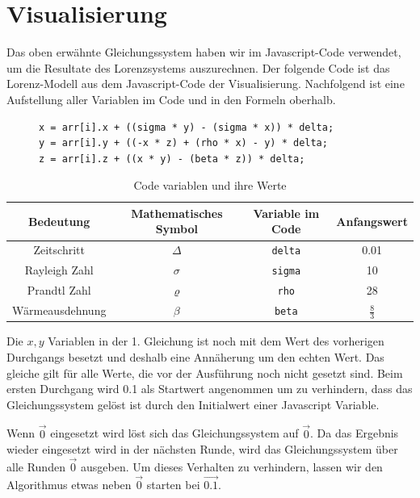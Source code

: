 
\section{Visualisierung}
Das oben erwähnte Gleichungssystem haben wir im Javascript-Code verwendet, um die Resultate des Lorenzsystems auszurechnen. Der folgende Code ist das Lorenz-Modell aus dem Javascript-Code der Visualisierung. Nachfolgend ist eine Aufstellung aller Variablen im Code und in den Formeln oberhalb.

\begin{figure}
	\begin{lstlisting}[style=C]
x = arr[i].x + ((sigma * y) - (sigma * x)) * delta;
y = arr[i].y + ((-x * z) + (rho * x) - y) * delta;
z = arr[i].z + ((x * y) - (beta * z)) * delta;
		\end{lstlisting}
\end{figure}

\begin{table}[]
	\begin{tabular}{| c | c | c | c |}
		\hline
		\textbf{Bedeutung} & \textbf{Mathematisches Symbol} & \textbf{Variable im Code} & \textbf{Anfangswert}\\\hline
		Zeitschritt & $ \Delta $ & \texttt{delta} & 0.01 \\\hline
		Rayleigh Zahl & $ \sigma $ & \texttt{sigma} & 10 \\\hline
		Prandtl Zahl & $\varrho $ & \texttt{rho} & 28 \\\hline
		Wärmeausdehnung & $\beta $ & \texttt{beta}  & $ \frac{8}{3} $ \\\hline
	\end{tabular}
	\caption{Code variablen und ihre Werte\label{CodeVariablen}}
\end{table}

Die $ x, y $ Variablen in der 1. Gleichung ist noch mit dem Wert des vorherigen Durchgangs besetzt und deshalb eine Annäherung um den echten Wert. Das gleiche gilt für alle Werte, die vor der Ausführung noch nicht gesetzt sind. 
Beim ersten Durchgang wird 0.1 als Startwert angenommen um zu verhindern, dass das Gleichungssystem gelöst ist durch den Initialwert einer Javascript Variable. 

Wenn $ \vec{0} $ eingesetzt wird löst sich das Gleichungssystem auf $ \vec{0} $. Da das Ergebnis wieder eingesetzt wird in der nächsten Runde, wird das Gleichungssystem über alle Runden $ \vec{0} $ ausgeben. Um dieses Verhalten zu verhindern, lassen wir den Algorithmus etwas neben $ \vec{0} $ starten bei $ \vec{0.1} $.

